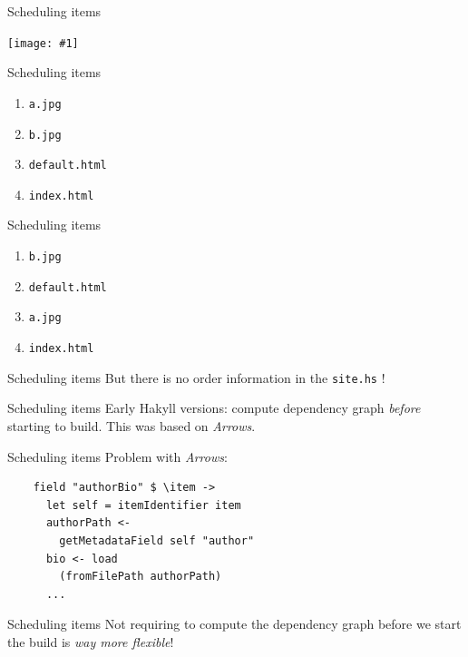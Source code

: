 \documentclass[20pt]{beamer}
\newcommand{\vspaced}{
    \vspace{5mm}
}
\newcommand{\imageframe}[1]{
    {
        \begin{frame}[plain]
        \begin{center}
        \texttt{[image: \#1]}
        \end{center}
        \end{frame}
    }
}
\newcommand{\chapterslide}[1]{
    {
        \begin{frame}[plain]
        \begin{center}
        \large{#1}
        \end{center}
        \end{frame}
    }
}
\newcommand{\code}[1]{
    \texttt{\small{#1}}
}
\begin{document}
\chapterslide{Scheduling items}

\imageframe{{images/deps-01.dot}.pdf}

\begin{frame}{Scheduling items}
    \begin{enumerate}
    \item \code{a.jpg}
    \item \code{b.jpg}
    \item \code{default.html}
    \item \code{index.html}
    \end{enumerate}
\end{frame}

\begin{frame}{Scheduling items}
    \begin{enumerate}
    \item \code{b.jpg}
    \item \code{default.html}
    \item \code{a.jpg}
    \item \code{index.html}
    \end{enumerate}
\end{frame}

\begin{frame}{Scheduling items}
    But there is no order information in the \code{site.hs}!
\end{frame}

\begin{frame}{Scheduling items}
    Early Hakyll versions: compute dependency graph \emph{before} starting to
    build.  This was based on \emph{Arrows}.
\end{frame}

\begin{frame}[fragile]{Scheduling items}
    Problem with \emph{Arrows}: \\
    \vspaced
    \begin{lstlisting}
    field "authorBio" $ \item ->
      let self = itemIdentifier item
      authorPath <-
        getMetadataField self "author"
      bio <- load
        (fromFilePath authorPath)
      ...
    \end{lstlisting}
\end{frame}

\begin{frame}{Scheduling items}
    Not requiring to compute the dependency graph before we start the build is
    \emph{way more flexible}!
\end{frame}
\end{document}
